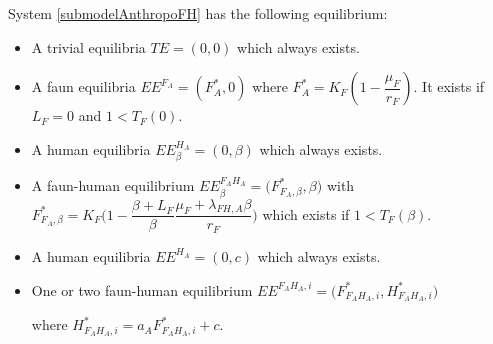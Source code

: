 \documentclass{article}
\newcommand{\lfa}{\lambda_{FH, A}}
\begin{document}
System \eqref{submodelAnthropoFH} has the following equilibrium:
\begin{itemize}
\item A trivial equilibria $TE= (0,0)$ which always exists.
\item A faun equilibria $EE^{F_A} = (F_A^*, 0)$ where $F_A^* = K_F\left(1 - \dfrac{\mu_F}{r_F}\right)$. It exists if $L_F = 0$ and $1 < T_F(0)$.
\item A human equilibria $EE^{H_A}_\beta = (0, \beta)$ which always exists.
\item A faun-human equilibrium $EE^{F_AH_A}_\beta = \Big(F^*_{F_A, \beta}, \beta\Big)$ with $F^*_{F_A, \beta} = K_F \Big(1-\dfrac{\beta + L_F}{\beta}\dfrac{\mu_F + \lfa \beta}{r_F}\Big)$ which exists if $1 < T_F(\beta)$.
\item A human equilibria $EE^{H_A} = (0, c)$ which always exists.
\item One or two faun-human equilibrium $EE^{F_AH_A, i} = \Big(F^*_{F_AH_A, i}, H^*_{F_AH_A, i}\Big)$ 
%
%
%
%
%
%

where $H^*_{F_AH_A, i} = a_AF^*_{F_AH_A, i}+c$.
\end{itemize}
\end{document}
